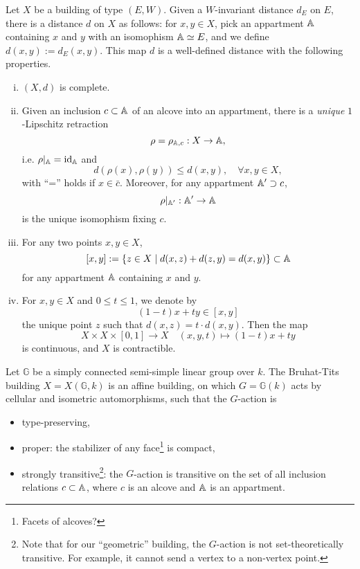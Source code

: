 \documentclass{article}
\begin{document}
\begin{theorem}\label{basic properties of a building}
    Let $X$ be a building of type $(E, W)$.
    Given a $W$-invariant distance $d_E$ on $E$,
    there is a distance $d$ on $X$ as follows: for $x, y\in X$, pick an appartment $\mathbb{A}$ containing $x$ and $y$ with an isomophism $\mathbb{A}\simeq E$,
    and we define $d(x, y) := d_E(x, y)$.
    This map $d$ is a well-defined distance with the following properties.\begin{enumerate}[(i)]
        \item $(X, d)$ is complete.
        \item Given an inclusion $c\subset\mathbb{A}$ of an alcove into an appartment,
        there is a \textit{unique} $1$-Lipschitz retraction\[\rho = \rho_{\mathbb{A}, c} : X\to\mathbb{A},\]
        i.e. $\rho|_{\mathbb{A}} = \operatorname{id}_{\mathbb{A}}$ and \[d(\rho(x), \rho(y))\le d(x, y),\quad\forall x, y\in X,\]
        with ``='' holds if $x\in \bar{c}$.
        Moreover, for any appartment $\mathbb{A}'\supset c$, \[\rho|_{\mathbb{A}'} : \mathbb{A}'\to\mathbb{A}\]is the unique isomophism fixing $c$.
        \item For any two points $x, y\in X$,
        \[[x, y] := \{z\in X\mid d(x, z) + d(z, y) = d(x, y)\} \subset\mathbb{A}\]
        for any appartment $\mathbb{A}$ containing $x$ and $y$.
        \item For $x, y\in X$ and $0\le t\le 1$,
        we denote by \[(1 - t)x + ty\in [x, y]\]
        the unique point $z$ such that $d(x, z) = t\cdot d(x, y)$.
        Then the map \[X\times X\times [0, 1]\to X\quad (x, y, t)\mapsto (1 - t)x + ty\]
        is continuous, and $X$ is contractible.
    \end{enumerate}
\end{theorem}

Let $\mathbb{G}$ be a simply connected semi-simple linear group over $k$.
The Bruhat-Tits building $X = X(\mathbb{G}, k)$
is an affine building, on which $G = \mathbb{G}(k)$ acts by cellular and isometric automorphisms,
such that the $G$-action is 
\begin{itemize}
    \item type-preserving,
    \item proper: the stabilizer of any face\footnote{
        Facets of alcoves?
    } is compact,
    \item strongly transitive\footnote{
        Note that for our ``geometric'' building, the $G$-action is not set-theoretically transitive. For example, it cannot send a vertex to a non-vertex point.
    }: the $G$-action is transitive on the set of all inclusion relations $c\subset\mathbb{A}$, where $c$ is an alcove and $\mathbb{A}$ is an appartment.
\end{itemize}
\end{document}
